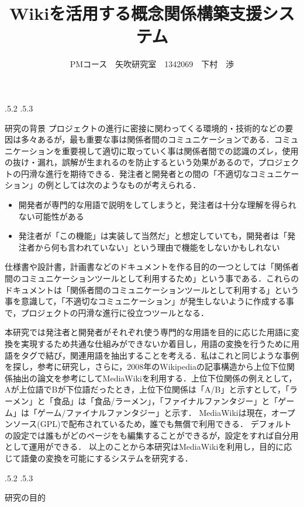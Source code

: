 \documentclass[uplatex]{jsarticle}
\title{\vspace{-14mm}Wikiを活用する概念関係構築支援システム}
\author{PMコース　矢吹研究室　1342069　下村　渉}
\date{}%
\makeatletter
\renewcommand{\section}{%
    \if@slide\clearpage\fi
    \@startsection{section}{1}{\z@}%
    {\Cvs \@plus.5\Cdp \@minus.2\Cdp}%
    {.5\Cvs \@plus.3\Cdp}%
    {\normalfont\raggedright}}
\makeatother
\begin{document}
\maketitle
\section{研究の背景}
プロジェクトの進行に密接に関わってくる環境的・技術的などの要因は多々あるが，最も重要な事は関係者間のコミュニケーションである．コミュニケーションを重要視して適切に取っていく事は関係者間での認識のズレ，使用の抜け・漏れ，誤解が生まれるのを防止するという効果があるので，プロジェクトの円滑な進行を期待できる．発注者と開発者との間の「不適切なコミュニケーション」の例としては次のようなものが考えられる．
\begin{itemize}
\item 開発者が専門的な用語で説明をしてしまうと，発注者は十分な理解を得られない可能性がある
\item 発注者が「この機能」は実装して当然だ」と想定していても，開発者は「発注者から何も言われていない」という理由で機能をしないかもしれない
\end{itemize}
仕様書や設計書，計画書などのドキュメントを作る目的の一つとしては「関係者間のコミュニケーションツールとして利用するため」という事である．これらのドキュメントは「関係者間のコミュニケーションツールとして利用する」という事を意識して，「不適切なコミュニケーション」が発生しないように作成する事で，プロジェクトの円滑な進行に役立つツールとなる\cite{a}．

本研究では発注者と開発者がそれぞれ使う専門的な用語を目的に応じた用語に変換を実現するため共通な仕組みができないか着目し，用語の変換を行うために用語をタグで結び，関連用語を抽出することを考える．私はこれと同じような事例を探し，参考に研究し，さらに，2008年のWikipediaの記事構造から上位下位関係抽出の論文を参考にしてMediaWikiを利用する\cite{b}．上位下位関係の例えとして，Aが上位語でBが下位語だったとき，上位下位関係は「A/B」と示すとして，「ラーメン」と「食品」は「食品/ラーメン」，「ファイナルファンタジー」と「ゲーム」は「ゲーム/ファイナルファンタジー」と示す．
MediaWikiは現在，オープンソース(GPL)で配布されているため，誰でも無償で利用できる\cite{c}．
デフォルトの設定では誰もがどのページをも編集することができるが，設定をすれば自分用として運用ができる\cite{d}．
以上のことから本研究はMediaWikiを利用し，目的に応じて語彙の変換を可能にするシステムを研究する．





\section{研究の目的}
\end{document}
